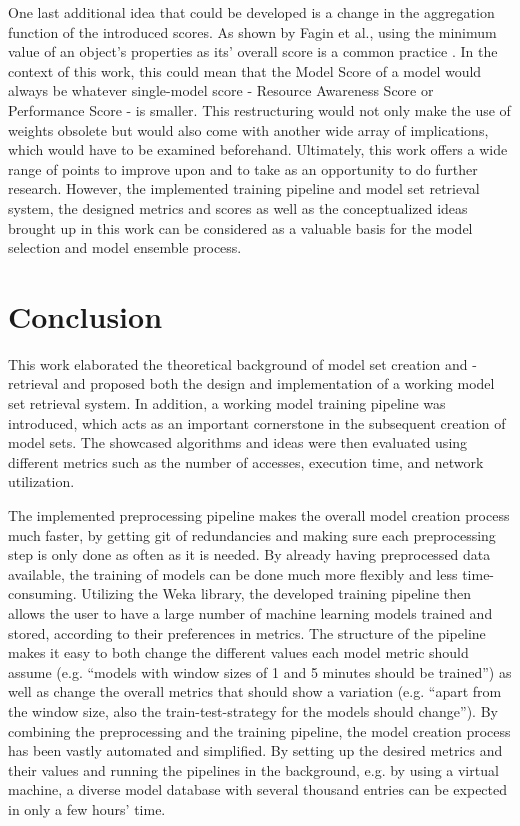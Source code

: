 One last additional idea that could be developed is a change in the aggregation function of the introduced scores. As shown by Fagin et al., using the minimum value of an object's properties as its’ overall score is a common practice \cite{fagin2002}. In the context of this work, this could mean that the Model Score of a model would always be whatever single-model score - Resource Awareness Score or Performance Score - is smaller. This restructuring would not only make the use of weights obsolete but would also come with another wide array of implications, which would have to be examined beforehand. Ultimately, this work offers a wide range of points to improve upon and to take as an opportunity to do further research. However, the implemented training pipeline and model set retrieval system, the designed metrics and scores as well as the conceptualized ideas brought up in this work can be considered as a valuable basis for the model selection and model ensemble process.




\section{Conclusion}

This work elaborated the theoretical background of model set creation and -retrieval and proposed both the design and implementation of a working model set retrieval system. In addition, a working model training pipeline was introduced, which acts as an important cornerstone in the subsequent creation of model sets. The showcased algorithms and ideas were then evaluated using different metrics such as the number of accesses, execution time, and network utilization.

The implemented preprocessing pipeline makes the overall model creation process much faster, by getting git of redundancies and making sure each preprocessing step is only done as often as it is needed. By already having preprocessed data available, the training of models can be done much more flexibly and less time-consuming. Utilizing the Weka library, the developed training pipeline then allows the user to have a large number of machine learning models trained and stored, according to their preferences in metrics. The structure of the pipeline makes it easy to both change the different values each model metric should assume (e.g. “models with window sizes of 1 and 5 minutes should be trained”) as well as change the overall metrics that should show a variation (e.g. “apart from the window size, also the train-test-strategy for the models should change”). By combining the preprocessing and the training pipeline, the model creation process has been vastly automated and simplified. By setting up the desired metrics and their values and running the pipelines in the background, e.g. by using a virtual machine, a diverse model database with several thousand entries can be expected in only a few hours’ time.

